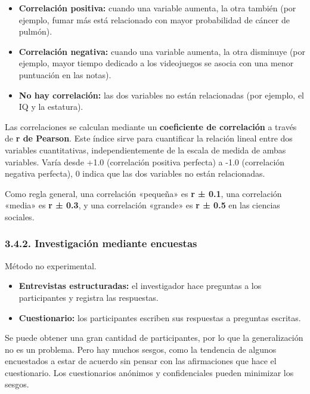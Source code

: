 \documentclass[
]{website}
\providecommand{\tightlist}{%
  \setlength{\itemsep}{0pt}\setlength{\parskip}{0pt}}
\begin{document}
\begin{itemize}
\tightlist
\item
  \textbf{Correlación positiva:} cuando una variable aumenta, la otra también (por ejemplo, fumar más está relacionado con mayor probabilidad de cáncer de pulmón).
\item
  \textbf{Correlación negativa:} cuando una variable aumenta, la otra disminuye (por ejemplo, mayor tiempo dedicado a los videojuegos se asocia con una menor puntuación en las notas).
\item
  \textbf{No hay correlación:} las dos variables no están relacionadas (por ejemplo, el IQ y la estatura).
\end{itemize}

Las correlaciones se calculan mediante un \textbf{coeficiente de correlación} a través de \textbf{r de Pearson}. Este índice sirve para cuantificar la relación lineal entre dos variables cuantitativas, independientemente de la escala de medida de ambas variables. Varía desde +1.0 (correlación positiva perfecta) a -1.0 (correlación negativa perfecta), 0 indica que las dos variables no están relacionadas.

Como regla general, una correlación «pequeña» es \textbf{r ± 0.1}, una correlación «media» es \textbf{r ± 0.3}, y una correlación «grande» es \textbf{r ± 0.5} en las ciencias sociales.

\subsubsection*{3.4.2. Investigación mediante encuestas}\label{subtema3_4_2}

Método no experimental.

\begin{itemize}
\tightlist
\item
  \textbf{Entrevistas estructuradas:} el investigador hace preguntas a los participantes y registra las respuestas.
\item
  \textbf{Cuestionario:} los participantes escriben sus respuestas a preguntas escritas.
\end{itemize}

Se puede obtener una gran cantidad de participantes, por lo que la generalización no es un problema. Pero hay muchos sesgos, como la tendencia de algunos encuestados a estar de acuerdo sin pensar con las afirmaciones que hace el cuestionario. Los cuestionarios anónimos y confidenciales pueden minimizar los sesgos.
\end{document}
